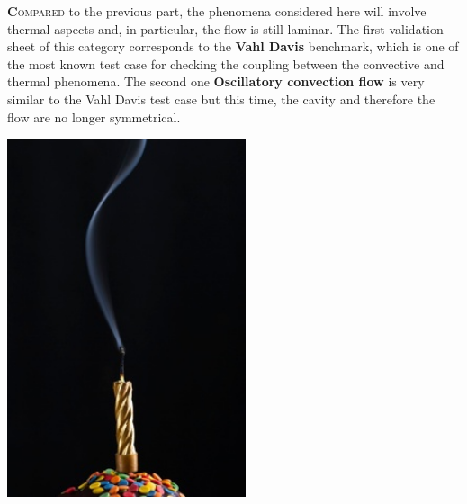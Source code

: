 \lettrine[lines=2,slope=0pt,nindent=4pt]{\textbf{C}}{ompared} to the previous part, the phenomena considered here will
involve thermal aspects and, in particular, the flow is still laminar.\newline
The first validation sheet of this category corresponds to the \textbf{Vahl Davis} benchmark, which is one of the
most known test case for checking the coupling between the convective and thermal phenomena.
The second one \textbf{Oscillatory convection flow} is very similar to the Vahl Davis test case but this time,
the cavity and therefore the flow are no longer symmetrical.
\vspace*{3cm}\newline
\begin{center}\includegraphics[width=7cm]{tools/bougie.png}\end{center}
